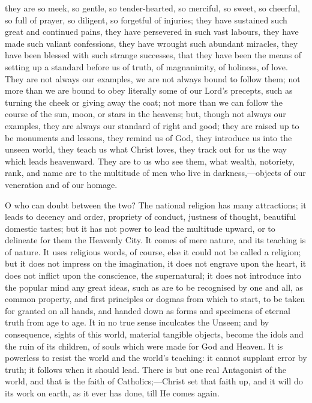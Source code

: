 they are so meek, so gentle, so tender-hearted, so merciful, so sweet,
so cheerful, so full of prayer, so diligent, so forgetful of injuries;
they have sustained such great and continued pains, they have
persevered in such vast labours, they have made such valiant
confessions, they have wrought such abundant miracles, they have been
blessed with such strange successes, that they have been the means of
setting up a standard before us of truth, of magnanimity, of holiness,
of love. They are not always our examples, we are not always bound to
follow them; not more than we are bound to obey literally some of our
Lord's precepts, such as turning the cheek or giving away the coat;
not more than we can follow the course of the sun, moon, or stars in
the heavens; but, though not always our examples, they are always our
standard of right and good; they are raised up to be monuments and
lessons, they remind us of God, they introduce us into the unseen
world, they teach us what Christ loves, they track out for us the way
which leads heavenward. They are to us who see them, what wealth,
notoriety, rank, and name are to the multitude of men who live in
darkness,—objects of our veneration and of our homage.

O who can doubt between the two? The national religion has many
attractions; it leads to decency and order, propriety of conduct,
justness of thought, beautiful domestic tastes; but it has not power
to lead the multitude upward, or to delineate for them the Heavenly
City. It comes of mere nature, and its teaching is of nature. It uses
religious words, of course, else it could not be called a religion;
but it does not impress on the imagination, it does not engrave upon
the heart, it does not inflict upon the conscience, the supernatural;
it does not introduce into the popular mind any great ideas, such as
are to be recognised by one and all, as common property, and first
principles or dogmas from which to start, to be taken for granted on
all hands, and handed down as forms and specimens of eternal truth
from age to age. It in no true sense inculcates the Unseen; and by
consequence, sights of this world, material tangible objects, become
the idols and the ruin of its children, of souls which were made for
God and Heaven. It is powerless to resist the world and the world's
teaching: it cannot supplant error by truth; it follows when it should
lead. There is but one real Antagonist of the world, and that is the
faith of Catholics;—Christ set that faith up, and it will do its
work on earth, as it ever has done, till He comes again.


